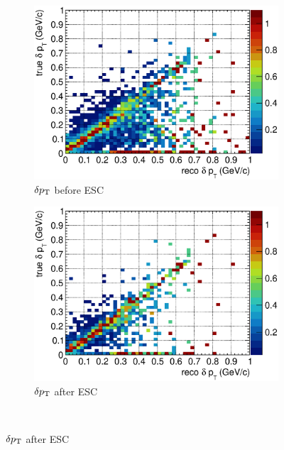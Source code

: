 \begin{figure}
          \\
          \begin{subfigure}[b]{\dbfigwid\textwidth}
               \centering
               \includegraphics[width=\textwidth]{figures/perf/tki/dpt_colnor_resmat_al10_sfgmu.eps}
               \caption{$\delta p_\textrm{T}$ before ESC}
               \label{subfig:esc-dpt-bfesc-sfgmu}
          \end{subfigure}
          \begin{subfigure}[b]{\dbfigwid\textwidth}
               \centering
               \includegraphics[width=\textwidth]{figures/perf/tki/dpt_colnor_resmat_al11_sfgmu.eps}
               \caption{$\delta p_\textrm{T}$ after ESC}
               \label{subfig:esc-dpt-afesc-sfgmu}
          \end{subfigure}
          \\

\end{figure}
